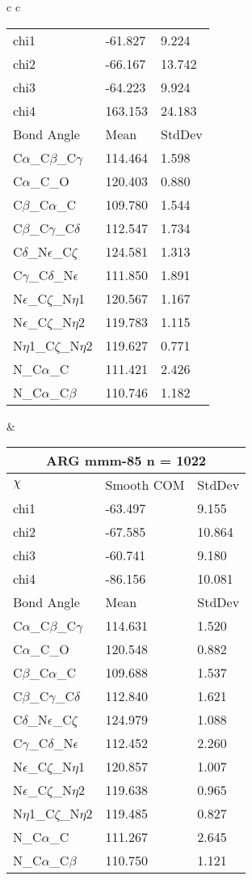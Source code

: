 \begin{longtable}{ c c }
\begin{tabular}{ l l l }
  chi1 & -61.827 & 9.224 \\ 
  chi2 & -66.167 & 13.742 \\ 
  chi3 & -64.223 & 9.924 \\ 
  chi4 & 163.153 & 24.183 \\ \midrule
  Bond Angle   & Mean     & StdDev \\ \midrule
  C$\alpha$\_C$\beta$\_C$\gamma$ & 114.464 & 1.598\\
  C$\alpha$\_C\_O & 120.403 & 0.880\\
  C$\beta$\_C$\alpha$\_C & 109.780 & 1.544\\
  C$\beta$\_C$\gamma$\_C$\delta$ & 112.547 & 1.734\\
  C$\delta$\_N$\epsilon$\_C$\zeta$ & 124.581 & 1.313\\
  C$\gamma$\_C$\delta$\_N$\epsilon$ & 111.850 & 1.891\\
  N$\epsilon$\_C$\zeta$\_N$\eta$1 & 120.567 & 1.167\\
  N$\epsilon$\_C$\zeta$\_N$\eta$2 & 119.783 & 1.115\\
  N$\eta$1\_C$\zeta$\_N$\eta$2 & 119.627 & 0.771\\
  N\_C$\alpha$\_C & 111.421 & 2.426\\
  N\_C$\alpha$\_C$\beta$ & 110.746 & 1.182\\
  \bottomrule
  \end{tabular}
  &
  \begin{tabular}{ l l l }
  \toprule
  \multicolumn{3}{c}{ARG \textbf{mmm-85} n = 1022} \\ \toprule
  $\chi$       & Smooth COM & StdDev \\ \midrule
  chi1 & -63.497 & 9.155 \\ 
  chi2 & -67.585 & 10.864 \\ 
  chi3 & -60.741 & 9.180 \\ 
  chi4 & -86.156 & 10.081 \\ \midrule
  Bond Angle   & Mean     & StdDev \\ \midrule
  C$\alpha$\_C$\beta$\_C$\gamma$ & 114.631 & 1.520\\
  C$\alpha$\_C\_O & 120.548 & 0.882\\
  C$\beta$\_C$\alpha$\_C & 109.688 & 1.537\\
  C$\beta$\_C$\gamma$\_C$\delta$ & 112.840 & 1.621\\
  C$\delta$\_N$\epsilon$\_C$\zeta$ & 124.979 & 1.088\\
  C$\gamma$\_C$\delta$\_N$\epsilon$ & 112.452 & 2.260\\
  N$\epsilon$\_C$\zeta$\_N$\eta$1 & 120.857 & 1.007\\
  N$\epsilon$\_C$\zeta$\_N$\eta$2 & 119.638 & 0.965\\
  N$\eta$1\_C$\zeta$\_N$\eta$2 & 119.485 & 0.827\\
  N\_C$\alpha$\_C & 111.267 & 2.645\\
  N\_C$\alpha$\_C$\beta$ & 110.750 & 1.121\\
  \bottomrule
  \end{tabular}
  \\
  
\end{longtable}    

